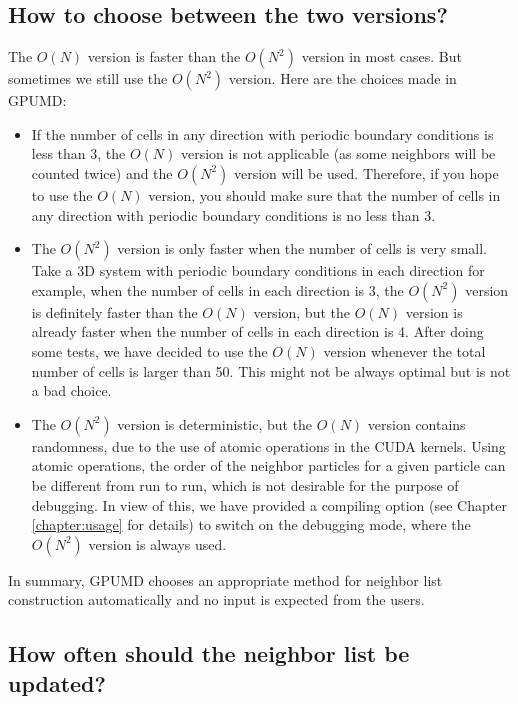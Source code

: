 \documentclass[12pt,a4paper]{report}
\begin{document}
\subsection{How to choose between the two versions?}

The $O(N)$ version is faster than the $O(N^2)$ version in most cases. But sometimes we still use the $O(N^2)$ version. Here are the choices made in GPUMD:
\begin{itemize}
\item If the number of cells in any direction with periodic boundary conditions is less than 3, the $O(N)$ version is not applicable (as some neighbors will be counted twice) and the $O(N^2)$ version will be used. Therefore, if you hope to use the $O(N)$ version, you should make sure that the number of cells in any direction with periodic boundary conditions is no less than 3.
\item The $O(N^2)$ version is only faster when the number of cells is very small. Take a 3D system with periodic boundary conditions in each direction for example, when the number of cells in each direction is 3, the $O(N^2)$ version is definitely faster than the $O(N)$ version, but the $O(N)$ version is already faster when the number of cells in each direction is 4. After doing some tests, we have decided to use the $O(N)$ version whenever the total number of cells is larger than 50. This might not be always optimal but is not a bad choice.
\item The $O(N^2)$ version is deterministic, but the $O(N)$ version contains randomness, due to the use of atomic operations in the CUDA kernels. Using atomic operations, the order of the neighbor particles for a given particle can be different from run to run, which is not desirable for the purpose of debugging. In view of this, we have provided a compiling option (see Chapter \ref{chapter:usage} for details) to switch on the debugging mode, where the $O(N^2)$ version is always used.
\end{itemize}
In summary, GPUMD chooses an appropriate method for neighbor list construction automatically and no input is expected from the users.


\subsection{How often should the neighbor list be updated?}
\end{document}
